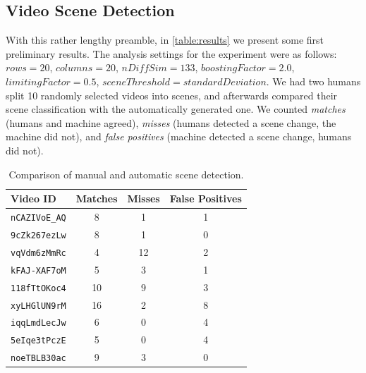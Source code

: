 \documentclass[10pt,twocolumn,letterpaper]{article}
\begin{document}
\subsection{Video Scene Detection}
With this rather lengthy preamble, in \autoref{table:results} we present some first preliminary results. The analysis settings for the experiment were as follows: $\mathit{rows} = 20$, $\mathit{columns} = 20$, $\mathit{nDiffSim} = 133$, $\mathit{boostingFactor} = 2.0$, $\mathit{limitingFactor} = 0.5$, $\mathit{sceneThreshold} = \mathit{standardDeviation}$. We had two humans split 10 randomly selected videos into scenes, and afterwards compared their scene classification with the automatically generated one. We counted \emph{matches} (humans and machine agreed), \emph{misses} (humans detected a scene change, the machine did not), and \emph{false positives} (machine detected a scene change, humans did not). 

\begin{table}
\begin{center}  
    \begin{tabular}{ | l | c | c | c |}
    \hline
    \textbf{Video ID} & \textbf{Matches} & \textbf{Misses} & \textbf{False Positives} \\ \hline
    \texttt{nCAZIVoE\_AQ} &  8 &  1 & 1 \\ \hline
    \texttt{9cZk267ezLw}  &  8 &  1 & 0 \\ \hline
    \texttt{vqVdm6zMmRc}  &  4 & 12 & 2 \\ \hline
    \texttt{kFAJ-XAF7oM}  &  5 &  3 & 1 \\ \hline
    \texttt{118fTtOKoc4}  & 10 &  9 & 3 \\ \hline
    \texttt{xyLHGlUN9rM}  & 16 &  2 & 8 \\ \hline
    \texttt{iqqLmdLecJw}  &  6 &  0 & 4 \\ \hline
    \texttt{5eIqe3tPczE}  &  5 &  0 & 4 \\ \hline
    \texttt{noeTBLB30ac}  &  9 &  3 & 0 \\ \hline
    \end{tabular}
\end{center}
\caption{Comparison of manual and automatic scene detection.}
\label{table:results}
\end{table}
\end{document}
